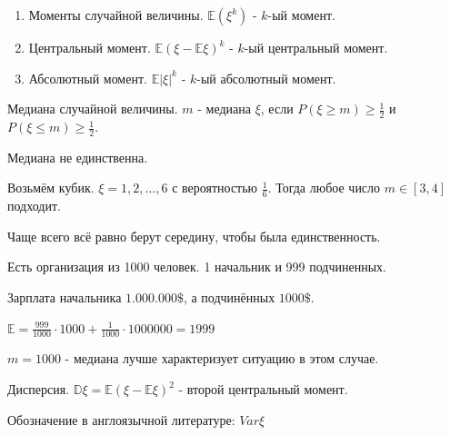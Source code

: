 \begin{definition}
    \begin{enumerate}
        \item Моменты случайной величины. $\mathbb{E} (\xi^k)$ - $k$-ый момент.
        \item Центральный момент. $\mathbb{E}(\xi - \mathbb{E}\xi)^k$ - $k$-ый центральный момент.
        \item Абсолютный момент. $\mathbb{E}|\xi|^k$ - $k$-ый абсолютный момент.
    \end{enumerate}
\end{definition}

\begin{definition}
    Медиана случайной величины. $m$ - медиана $\xi$, если $P(\xi \geqslant m) \geqslant \frac{1}{2}$ и 
    $P(\xi \leqslant m) \geqslant \frac{1}{2}$.

    \begin{remark}
        Медиана не единственна.

        Возьмём кубик. $\xi = 1, 2, \ldots, 6$ с вероятностью $\frac{1}{6}$. 
        Тогда любое число $m \in [3, 4]$ подходит.

        Чаще всего всё равно берут середину, чтобы была единственность.
    \end{remark}
\end{definition}

\begin{example}
    Есть организация из 1000 человек. 1 начальник и 999 подчиненных.

    Зарплата начальника $1.000.000 \$ $, а подчинённых $1000 \$ $.

    $\mathbb{E} = \frac{999}{1000} \cdot 1000 + \frac{1}{1000} \cdot 1000000 = 1999$

    $m = 1000$ - медиана лучше характеризует ситуацию в этом случае.
\end{example}

\begin{definition}
    Дисперсия. $\mathbb{D} \xi = \mathbb{E}(\xi - \mathbb{E} \xi)^2$ - второй центральный момент.

    Обозначение в англоязычной литературе: $Var \xi$
\end{definition}

